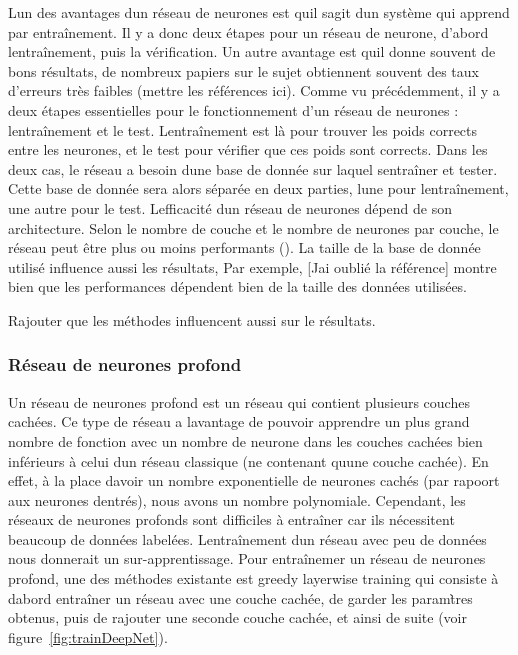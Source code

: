 \documentclass[11pt]{sdm}
\begin{document}
		\bigbreak
		\bigbreak

		L\textquotesingle un des avantages d\textquotesingle un r\'eseau de neurones est qu\textquotesingle il s\textquotesingle agit d\textquotesingle un syst\`eme qui apprend par entra\^inement. Il y a donc deux \'etapes pour un r\'eseau de neurone, d’abord l\textquotesingle entra\^inement, puis la v\'erification. Un autre avantage est qu\textquotesingle il donne souvent de bons r\'esultats, de nombreux papiers sur le sujet obtiennent souvent des taux d’erreurs tr\`es faibles (mettre les r\'ef\'erences ici).
		Comme vu pr\'ec\'edemment, il y a deux \'etapes essentielles pour le fonctionnement d’un r\'eseau de neurones : l\textquotesingle entra\^inement et le test. L\textquotesingle entra\^inement est l\`a pour trouver les poids corrects entre les neurones, et le test pour v\'erifier que ces poids sont corrects. Dans les deux cas, le r\'eseau a besoin d\textquotesingle une base de donn\'ee sur laquel s\textquotesingle entra\^iner et tester. Cette base de donn\'ee sera alors s\'epar\'ee en deux parties, l\textquotesingle une pour l\textquotesingle entra\^inement, une autre pour le test.
		L\textquotesingle efficacit\'e d\textquotesingle un r\'eseau de neurones d\'epend de son architecture. Selon le nombre de couche et le nombre de neurones par couche, le r\'eseau peut \^etre plus ou moins performants (\cite{chatfield2014return}\cite{srivastava2014dropout}). La taille de la base de donn\'ee utilis\'e influence aussi les r\'esultats, Par exemple, [J\textquotesingle ai oubli\'e la r\'ef\'erence] montre bien que les performances d\'ependent bien de la taille des donn\'ees utilis\'ees. \begin{itshape} Rajouter que les m\'ethodes influencent aussi sur le r\'esultats. \end{itshape}

		\subsubsection{R\'eseau de neurones profond\textquotesingle }
			Un r\'eseau de neurones profond est un r\'eseau qui contient plusieurs couches cach\'ees. Ce type de r\'eseau a l\textquotesingle avantage de pouvoir apprendre un plus grand nombre de fonction avec un nombre de neurone dans les couches cach\'ees bien inf\'erieurs \`a celui d\textquotesingle un r\'eseau classique (ne contenant qu\textquotesingle une couche cach\'ee). En effet, \`a la place d\textquotesingle avoir un nombre exponentielle de neurones cach\'es (par rapoort aux neurones d\textquotesingle entr\'es), nous avons un nombre polynomiale.
			Cependant, les r\'eseaux de neurones profonds sont difficiles \`a entra\^iner car ils n\'ecessitent beaucoup de donn\'ees label\'ees. L\textquotesingle entra\^inement d\textquotesingle un r\'eseau avec peu de donn\'ees nous donnerait un sur-apprentissage.
			Pour entra\^inemer un r\'eseau de neurones profond, une des m\'ethodes existante est greedy layerwise training qui consiste \`a d\textquotesingle abord entra\^iner un r\'eseau avec une couche cach\'ee, de garder les param\`tres obtenus, puis de rajouter une seconde couche cach\'ee, et ainsi de suite (voir figure~\ref{fig:trainDeepNet}).
\end{document}
